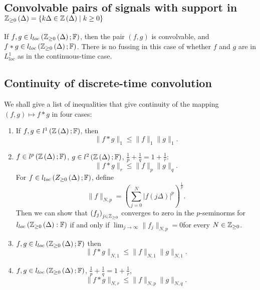 
\subsection{Convolvable pairs of signals with support in $\mathbb{Z} _{\ge  0}\left( \Delta \right) = \left\{ k \Delta \in  \mathbb{Z}\left( \Delta \right)  \mid  k \ge  0 \right\} $}	

If $f, g \in  l_{loc} \left( \mathbb{Z}_{\ge 0}\left( \Delta \right) ; \mathbb{F} \right) $, then the pair $\left( f, g \right) $ is convolvable, and $f * g \in  l_{loc}\left( \mathbb{Z}_{\ge  0}\left( \Delta \right) ; \mathbb{F} \right) $. There is no fussing in this case of whether $f$ and $g$ are in $L^{1}_{loc}$ as in the continuous-time case.

\subsection{Continuity of discrete-time convolution}

We shall give a list of inequalities that give continuity of the mapping $\left( f, g \right) \longmapsto f * g$ in four cases:
\begin{enumerate}
	\item If $f, g \in  l ^{1}\left( \mathbb{Z} \left( \Delta \right) ; \mathbb{F} \right) $, then 
		\[
		 \|f * g\|_{1}\le  \|f\|_{1}\|g \|_{1}
		.\] 
	\item $f \in l ^{p}\left( \mathbb{Z}\left( \Delta \right) ; \mathbb{F} \right) $, $g \in  l^{2}\left( \mathbb{Z}\left( \Delta \right) ; \mathbb{F} \right) $, $\frac{1}{p} + \frac{1}{q} = 1 + \frac{1}{r}$:
		\[
		\| f * g \|_{r} \le  \| f \|_{p}\| g \|_{q}
		.\] 
		For $f \in  l _{loc}\left( Z_{\ge 0}\left( \Delta \right) ; \mathbb{F} \right) $, define 
		\[
			\| f \|_{N, p} = \left( \sum_{j = 0}^{N} \left| f \left( j \Delta \right)  \right| ^{p} \right) ^{\frac{1}{p}}
		.\] 
		Then we can show that $\left( f _{j} \right) _{j \in  \mathbb{Z}_{\ge 0}}$ converges to zero in the $p$-seminorms for $l _{loc} \left( \mathbb{Z}_{\ge  0}\left( \Delta \right) : \mathbb{F} \right) $ if and only if $\lim_{j \to \infty} \|f _{j}\|_{N, p} = 0 $for every $N \in  \mathbb{Z}_{\ge  0}$.
	\item $f, g \in  l_{loc}\left( \mathbb{Z}_{\ge 0}\left( \Delta \right) ; \mathbb{F} \right) $ then 
		\[
		\| f * g\|_{N, 1}\le  \| f\|_{N, 1} \| g\|_{N, 1}
		.\] 
	\item $f, g \in  l_{loc}\left( \mathbb{Z}_{\ge 0}\left( \Delta \right) ; \mathbb{F} \right) $, $\frac{1}{p} + \frac{1}{q} = 1 + \frac{1}{r}$, 
		\[
		\| f * g\|_{N, r} \le  \| f\|_{N, p}\| g\|_{N, q}
		.\] 
\end{enumerate}

